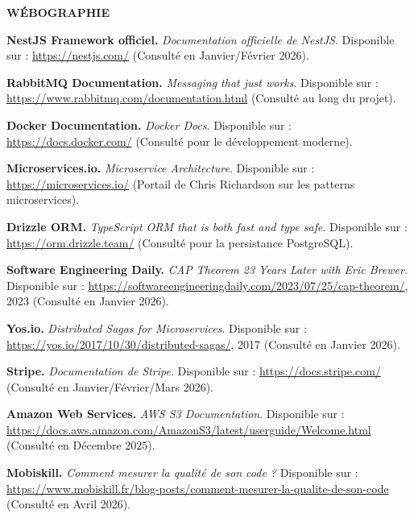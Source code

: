 \newpage
\thispagestyle{normalpage}

\begin{center}
    \large \textbf{WÉBOGRAPHIE}
\end{center}
\vspace{1cm}

\begin{enumerate}[label={[W\arabic*]}]
    \item \textbf{NestJS Framework officiel.} \textit{Documentation officielle de NestJS}. Disponible sur : \url{https://nestjs.com/} (Consulté en Janvier/Février 2026).
    \item \textbf{RabbitMQ Documentation.} \textit{Messaging that just works}. Disponible sur : \url{https://www.rabbitmq.com/documentation.html} (Consulté au long du projet).
    \item \textbf{Docker Documentation.} \textit{Docker Docs}. Disponible sur : \url{https://docs.docker.com/} (Consulté pour le développement moderne).
    \item \textbf{Microservices.io.} \textit{Microservice Architecture}. Disponible sur : \url{https://microservices.io/} (Portail de Chris Richardson sur les patterns microservices).
    \item \textbf{Drizzle ORM.} \textit{TypeScript ORM that is both fast and type safe}. Disponible sur : \url{https://orm.drizzle.team/} (Consulté pour la persistance PostgreSQL).
    \item \textbf{Software Engineering Daily.} \textit{CAP Theorem 23 Years Later with Eric Brewer}. Disponible sur : \url{https://softwareengineeringdaily.com/2023/07/25/cap-theorem/}, 2023 (Consulté en Janvier 2026).
    \item \textbf{Yos.io.} \textit{Distributed Sagas for Microservices}. Disponible sur : \url{https://yos.io/2017/10/30/distributed-sagas/}, 2017 (Consulté en Janvier 2026).
    \item \textbf{Stripe.} \textit{Documentation de Stripe}. Disponible sur : \url{https://docs.stripe.com/} (Consulté en Janvier/Février/Mars 2026).
    \item \textbf{Amazon Web Services.} \textit{AWS S3 Documentation}. Disponible sur : \url{https://docs.aws.amazon.com/AmazonS3/latest/userguide/Welcome.html} (Consulté en Décembre 2025).
    \item \textbf{Mobiskill.} \textit{Comment mesurer la qualité de son code ?} Disponible sur : \url{https://www.mobiskill.fr/blog-posts/comment-mesurer-la-qualite-de-son-code} (Consulté en Avril 2026).

\end{enumerate}
